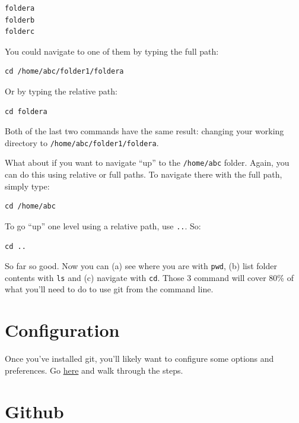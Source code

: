 \documentclass[
]{book}
\begin{document}
\begin{verbatim}
foldera
folderb
folderc
\end{verbatim}

You could navigate to one of them by typing the full path:

\begin{verbatim}
cd /home/abc/folder1/foldera
\end{verbatim}

Or by typing the relative path:

\begin{verbatim}
cd foldera
\end{verbatim}

Both of the last two commands have the same result: changing your working directory to \texttt{/home/abc/folder1/foldera}.

What about if you want to navigate ``up'' to the \texttt{/home/abc} folder. Again, you can do this using relative or full paths. To navigate there with the full path, simply type:

\begin{verbatim}
cd /home/abc
\end{verbatim}

To go ``up'' one level using a relative path, use \texttt{..}. So:

\begin{verbatim}
cd ..
\end{verbatim}

So far so good. Now you can (a) see where you are with \texttt{pwd}, (b) list folder contents with \texttt{ls} and (c) navigate with \texttt{cd}. Those 3 command will cover 80\% of what you'll need to do to use git from the command line.

\hypertarget{configuration}{%
\section*{Configuration}\label{configuration}}

Once you've installed git, you'll likely want to configure some options and preferences. Go \href{https://git-scm.com/book/en/v2/Getting-Started-First-Time-Git-Setup}{here} and walk through the steps.

\hypertarget{github}{%
\section*{Github}\label{github}}
\end{document}

